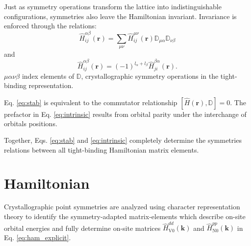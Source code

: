 \documentclass[twocolumn,showpacs,preprintnumbers,superscriptaddress,prb,floatfix,aps,10pt]{revtex4-1}
\renewcommand{\vec}[1]{\ensuremath{\mathbf{#1}}}
\newcommand*{\ham}{\hat{H}}
\newcommand*{\wignerD}{\mathbb{D}}%
\begin{document}
Just as symmetry operations transform the lattice into indistinguishable configurations, symmetries also leave the Hamiltonian invariant. Invariance is enforced through the relations:
\begin{equation}
\label{eq:stab}
\ham^{\alpha\beta}_{ij}(\vec{r}) = \sum_{\mu\nu} \ham^{\mu\nu}_{ij}(\vec{r}) \mathbb{D}_{\mu\alpha} \mathbb{D}_{\nu\beta}
\end{equation}
and
%
\begin{equation}
\label{eq:intrinsic}
\ham^{\alpha\beta}_{ij}(\vec{r}) = (-1)^{l_\alpha+l_\beta} \ham^{\beta\alpha}_{ji}(\vec{r}).
\end{equation}
%
$\mu\alpha\nu\beta$ index elements of $\mathbb{D}$, crystallographic symmetry operations in the tight-binding representation. 


Eq. \ref{eq:stab} is equivalent to the commutator relationship $[\ham(\vec{r}),\wignerD] = 0$. The prefactor in Eq. \ref{eq:intrinsic} results from orbital parity under the interchange of orbitals positions. 


Together, Eqs. \ref{eq:stab} and \ref{eq:intrinsic} completely determine the symmetries relations between all tight-binding Hamiltonian matrix elements.









\section{Hamiltonian}


Crystallographic point symmetries are analyzed using character representation theory to identify the symmetry-adapted matrix-elements which describe on-site orbital energies and fully determine on-site matrices $\ham_{\textrm{V}0}^{dd}(\vec{k}) $ and $\ham_{\textrm{N}0}^{pp}(\vec{k})$ in Eq. \ref{eq:ham_explicit}. 
\end{document}
